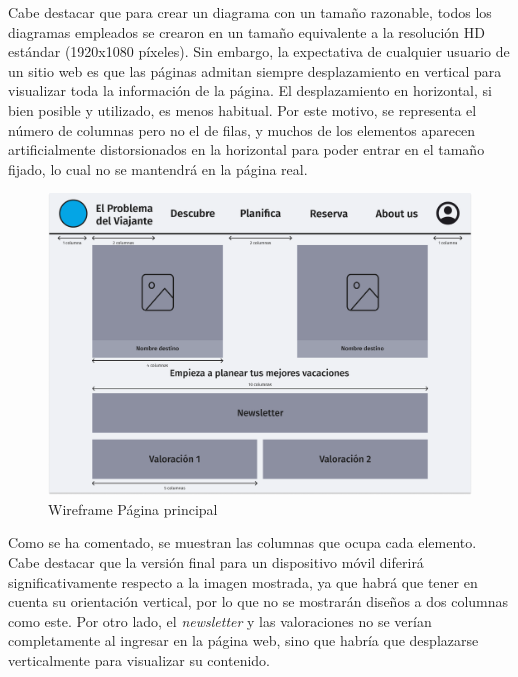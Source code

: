\documentclass[11pt, a4paper]{book}
\begin{document}
	Cabe destacar que para crear un diagrama con un tamaño razonable, todos los diagramas empleados se crearon en un tamaño equivalente a la resolución HD estándar (1920x1080 píxeles). Sin embargo, la expectativa de cualquier usuario de un sitio web es que las páginas admitan siempre desplazamiento en vertical para visualizar toda la información de la página. El desplazamiento en horizontal, si bien posible y utilizado, es menos habitual. Por este motivo, se representa el número de columnas pero no el de filas, y muchos de los elementos aparecen artificialmente distorsionados en la horizontal para poder entrar en el tamaño fijado, lo cual no se mantendrá en la página real.
	
	
	\begin{figure} [H]
		\centering
		\includegraphics[width=\textwidth]{wireframe-principal.png}
		\caption{Wireframe Página principal}
	\end{figure} 

	Como se ha comentado, se muestran las columnas que ocupa cada elemento. Cabe destacar que la versión final para un dispositivo móvil diferirá significativamente respecto a la imagen mostrada, ya que habrá que tener en cuenta su orientación vertical, por lo que no se mostrarán diseños a dos columnas como este. Por otro lado, el \textit{newsletter} y las valoraciones no se verían completamente al ingresar en la página web, sino que habría que desplazarse verticalmente para visualizar su contenido.
	
\end{document}
